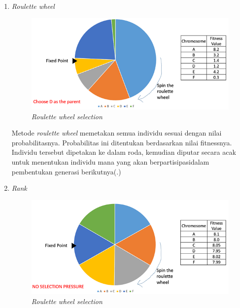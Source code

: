 \begin{enumerate}
  \begin{enumerate}
    \item \emph{Roulette wheel}
    \begin{figure} [ht] \centering
      \includegraphics[scale=0.6]{gambar/roulette_wheel_selection.jpg}
      \caption{\emph{Roulette wheel selection}}
      \label{fig:roulette}
    \end{figure}

    Metode \emph{roulette wheel} memetakan semua individu sesuai dengan nilai probabilitasnya. Probabilitas ini ditentukan berdasarkan nilai fitnessnya. Individu tersebut dipetakan ke dalam roda, kemudian diputar secara acak untuk menentukan individu mana yang akan berpartisipasidalam pembentukan generasi berikutnya(\cite{Katoch2020}.)
    
    \item \emph{Rank}
    \begin{figure} [ht] \centering
      \includegraphics[scale=0.6]{gambar/rank_selection.jpg}
      \caption{\emph{Roulette wheel selection}}
      \label{fig:roulette}
    \end{figure}
    

\end{enumerate}
\end{enumerate}
